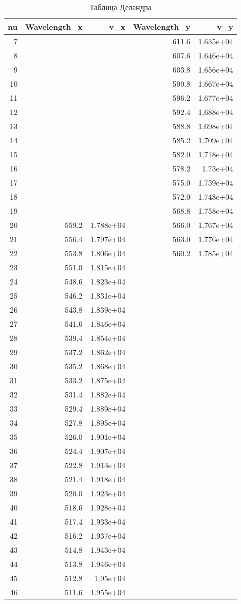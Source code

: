\begin{table}
\caption{Таблица Деландра}
\begin{tabular}{rrrrr}
\toprule
nu & Wavelength_x & v_x & Wavelength_y & v_y \\
\midrule
7 &  &  & 611.6 & 1.635e+04 \\
8 &  &  & 607.6 & 1.646e+04 \\
9 &  &  & 603.8 & 1.656e+04 \\
10 &  &  & 599.8 & 1.667e+04 \\
11 &  &  & 596.2 & 1.677e+04 \\
12 &  &  & 592.4 & 1.688e+04 \\
13 &  &  & 588.8 & 1.698e+04 \\
14 &  &  & 585.2 & 1.709e+04 \\
15 &  &  & 582.0 & 1.718e+04 \\
16 &  &  & 578.2 & 1.73e+04 \\
17 &  &  & 575.0 & 1.739e+04 \\
18 &  &  & 572.0 & 1.748e+04 \\
19 &  &  & 568.8 & 1.758e+04 \\
20 & 559.2 & 1.788e+04 & 566.0 & 1.767e+04 \\
21 & 556.4 & 1.797e+04 & 563.0 & 1.776e+04 \\
22 & 553.8 & 1.806e+04 & 560.2 & 1.785e+04 \\
23 & 551.0 & 1.815e+04 &  &  \\
24 & 548.6 & 1.823e+04 &  &  \\
25 & 546.2 & 1.831e+04 &  &  \\
26 & 543.8 & 1.839e+04 &  &  \\
27 & 541.6 & 1.846e+04 &  &  \\
28 & 539.4 & 1.854e+04 &  &  \\
29 & 537.2 & 1.862e+04 &  &  \\
30 & 535.2 & 1.868e+04 &  &  \\
31 & 533.2 & 1.875e+04 &  &  \\
32 & 531.4 & 1.882e+04 &  &  \\
33 & 529.4 & 1.889e+04 &  &  \\
34 & 527.8 & 1.895e+04 &  &  \\
35 & 526.0 & 1.901e+04 &  &  \\
36 & 524.4 & 1.907e+04 &  &  \\
37 & 522.8 & 1.913e+04 &  &  \\
38 & 521.4 & 1.918e+04 &  &  \\
39 & 520.0 & 1.923e+04 &  &  \\
40 & 518.6 & 1.928e+04 &  &  \\
41 & 517.4 & 1.933e+04 &  &  \\
42 & 516.2 & 1.937e+04 &  &  \\
43 & 514.8 & 1.943e+04 &  &  \\
44 & 513.8 & 1.946e+04 &  &  \\
45 & 512.8 & 1.95e+04 &  &  \\
46 & 511.6 & 1.955e+04 &  &  \\
\bottomrule
\end{tabular}
\end{table}
